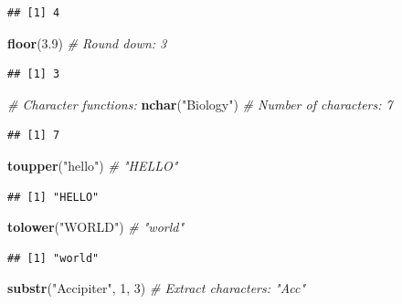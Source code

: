 \documentclass[
]{article}
\newenvironment{Shaded}{\begin{snugshade}}{\end{snugshade}}
\newcommand{\CommentTok}[1]{\textcolor[rgb]{0.56,0.35,0.01}{\textit{#1}}}
\newcommand{\DecValTok}[1]{\textcolor[rgb]{0.00,0.00,0.81}{#1}}
\newcommand{\FloatTok}[1]{\textcolor[rgb]{0.00,0.00,0.81}{#1}}
\newcommand{\FunctionTok}[1]{\textcolor[rgb]{0.13,0.29,0.53}{\textbf{#1}}}
\newcommand{\NormalTok}[1]{#1}
\newcommand{\StringTok}[1]{\textcolor[rgb]{0.31,0.60,0.02}{#1}}
\begin{document}
\begin{verbatim}
## [1] 4
\end{verbatim}

\begin{Shaded}
\begin{Highlighting}[]
\FunctionTok{floor}\NormalTok{(}\FloatTok{3.9}\NormalTok{)         }\CommentTok{\# Round down: 3}
\end{Highlighting}
\end{Shaded}

\begin{verbatim}
## [1] 3
\end{verbatim}

\begin{Shaded}
\begin{Highlighting}[]
\CommentTok{\# Character functions:}
\FunctionTok{nchar}\NormalTok{(}\StringTok{"Biology"}\NormalTok{)           }\CommentTok{\# Number of characters: 7}
\end{Highlighting}
\end{Shaded}

\begin{verbatim}
## [1] 7
\end{verbatim}

\begin{Shaded}
\begin{Highlighting}[]
\FunctionTok{toupper}\NormalTok{(}\StringTok{"hello"}\NormalTok{)           }\CommentTok{\# "HELLO"}
\end{Highlighting}
\end{Shaded}

\begin{verbatim}
## [1] "HELLO"
\end{verbatim}

\begin{Shaded}
\begin{Highlighting}[]
\FunctionTok{tolower}\NormalTok{(}\StringTok{"WORLD"}\NormalTok{)           }\CommentTok{\# "world"}
\end{Highlighting}
\end{Shaded}

\begin{verbatim}
## [1] "world"
\end{verbatim}

\begin{Shaded}
\begin{Highlighting}[]
\FunctionTok{substr}\NormalTok{(}\StringTok{"Accipiter"}\NormalTok{, }\DecValTok{1}\NormalTok{, }\DecValTok{3}\NormalTok{)  }\CommentTok{\# Extract characters: "Acc"}
\end{Highlighting}
\end{Shaded}
\end{document}

